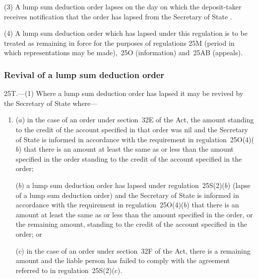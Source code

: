 \documentclass[12pt,a4paper]{article}
\begin{document}
(3) A lump sum deduction order lapses on the day on which the deposit-taker receives notification that the order has lapsed from the 
Secretary of State%
.

(4) A lump sum deduction order which has lapsed under this regulation is to be treated as remaining in force for the purposes of regulations 25M (period in which representations may be made),~25O (information) and~25AB (appeals).


\subsubsection[25T. Revival of a lump sum deduction order]{Revival of a lump sum deduction order}

25T.---(1)  Where a lump sum deduction order has lapsed it may be revived by the 
Secretary of State  %
where—
\begin{enumerate}\item[]
($a$) in the case of an order under section~32E of the Act, the amount standing to the credit of the account specified in that order was nil and the 
Secretary of State  %
is informed in accordance with the requirement in regulation~25O(4)($b$)  that there is an amount at least the same as or less than the amount specified in the order standing to the credit of the account specified in the order;

($b$) a lump sum deduction order has lapsed under regulation~25S(2)($b$)  (lapse of a lump sum deduction order) and the 
Secretary of State  %
is informed in accordance with the requirement in regulation~25O(4)($b$)  that there is an amount at least the same as or less than the amount specified in the order, or the remaining amount, standing to the credit of the account specified in the order; or

($c$) in the case of an order under section~32F of the Act, there is a remaining amount and the liable person has failed to comply with the agreement referred to in regulation~25S(2)($c$).
\end{enumerate}
\end{document}
